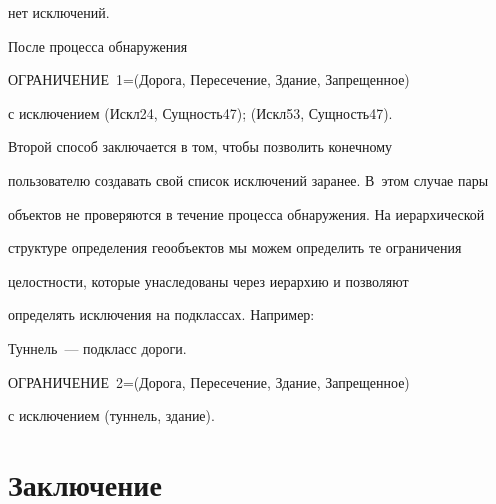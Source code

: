 \noindent


нет исключений. 





\smallskip





\noindent


После процесса обнаружения





\noindent


ОГРАНИЧЕНИЕ~1\;=\;(Дорога, Пересечение, Здание, Запрещенное)  





\noindent


с исключением (Искл24, Сущность47); (Искл53, Сущность47). 


     


\smallskip





    Второй способ заключается в том, чтобы позволить конечному 


пользователю создавать свой список исключений заранее. В~этом случае пары 


объектов не проверяются в течение процесса обнаружения. На иерархической 


структуре определения геообъектов мы можем определить те ограничения 


целостности, которые унаследованы через иерархию и позволяют 


определять исключения на подклассах. Например:


    


    \noindent


Туннель~--- подкласс дороги. 





\noindent


ОГРАНИЧЕНИЕ~2\;=\;(Дорога, Пересечение, Здание, Запрещенное)  





\noindent


с исключением (туннель, здание). 





\section{Заключение}


